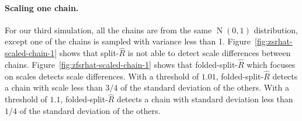 \documentclass[american,]{article}
\let\oldparagraph\paragraph
\renewcommand{\paragraph}[1]{\oldparagraph{#1}\mbox{}}
\DeclareMathOperator{\N}{N}
\theoremstyle{definition}
\begin{document}
\hypertarget{scaling-one-chain}{%
\paragraph{Scaling one chain.}\label{scaling-one-chain}}
For our third simulation, all the chains are from the same $\N(0, 1)$ distribution,
except one of the chains is sampled with variance less than 1.
Figure~\ref{fig:zsrhat-scaled-chain-1} shows that
split-\(\widehat{R}\) is not able to detect scale differences between
chains.
%
Figure~\ref{fig:zfsrhat-scaled-chain-1} shows that
folded-split-\(\widehat{R}\) which focuses on scales detects scale
differences. With a threshold of \(1.01\),
folded-split-\(\widehat{R}\) detects a chain with scale less than
\(3/4\) of the standard deviation of the others. With a threshold of
\(1.1\), folded-split-\(\widehat{R}\) detects a chain with standard
deviation less than \(1/4\) of the standard deviation of the others.
\end{document}
